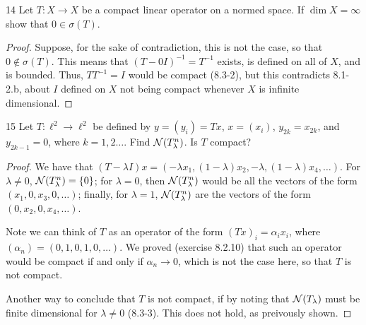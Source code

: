 \begin{exercise}{14}
Let $T: X \to X$ be a compact linear operator on a normed space.
If $\dim X = \infty$ show that $0 \in \sigma(T)$.
\end{exercise}
\begin{proof}
Suppose, for the sake of contradiction, this is not the case, so that $0 \notin \sigma(T)$.
This means that $(T - 0I)^{-1} = T^{-1}$ exists, is defined on all of $X$, and is bounded.
Thus, $T T^{-1} = I$ would be compact (8.3-2), but this contradicts 8.1-2.b, about $I$ defined on $X$ not being compact whenever $X$ is infinite dimensional.
\end{proof} 

\begin{exercise}{15}
Let $T: \ell^2 \to \ell^2$ be defined by $y = (y_i) = T x$, $x = (x_i)$, $y_{2k} = x_{2k}$, and $y_{2k - 1} = 0$, where $k = 1, 2 \dots$.
Find $\mathcal{N}(T_\lambda^n)$.
Is $T$ compact?
\end{exercise}
\begin{proof}
We have that $(T - \lambda I)x = (-\lambda x_1, (1 - \lambda) x_2, - \lambda, (1 - \lambda) x_4, \dots)$.
For $\lambda \neq 0$, $\mathcal{N}(T_\lambda^n) = \{0\}$; 
for $\lambda = 0$, then $\mathcal{N}(T_\lambda^n)$ would be all the vectors of the form $(x_1, 0, x_3, 0, \dots)$;
finally, for $\lambda = 1$, $\mathcal{N}(T_\lambda^n)$ are the vectors of the form $(0, x_2, 0, x_4, \dots)$.

Note we can think of $T$ as an operator of the form $(T x)_i = \alpha_i x_i$, where $(\alpha_n) = (0, 1, 0, 1, 0, \dots)$.
We proved (exercise 8.2.10) that such an operator would be compact if and only if $\alpha_n \to 0$, which is not the case here, so that $T$ is not compact.

Another way to conclude that $T$ is not compact, if by noting that $\mathcal{N}(T_\lambda)$ must be finite dimensional for $\lambda \neq 0$ (8.3-3).
This does not hold, as preivously shown.
\end{proof} 
